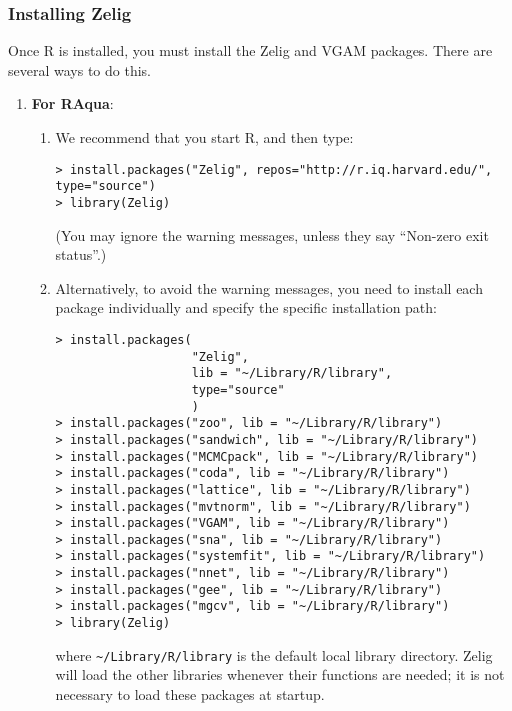 \subsubsection{Installing Zelig}\label{osx.manual}

Once R is installed, you must install the Zelig and VGAM packages.
There are several ways to do this.
\begin{enumerate}
\item {\bf For RAqua}:
  \begin{enumerate}
    
  \item We recommend that you start R, and then type:
\begin{verbatim}
> install.packages("Zelig", repos="http://r.iq.harvard.edu/", type="source")
> library(Zelig)
\end{verbatim}
(You may ignore the warning messages, unless they say ``Non-zero exit 
status''.)
\item Alternatively, to avoid the warning messages, you need to install 
each package individually and specify the specific installation path:
\begin{verbatim}
> install.packages(
                   "Zelig",
                   lib = "~/Library/R/library",
                   type="source"
                   )
> install.packages("zoo", lib = "~/Library/R/library")
> install.packages("sandwich", lib = "~/Library/R/library")
> install.packages("MCMCpack", lib = "~/Library/R/library")
> install.packages("coda", lib = "~/Library/R/library")
> install.packages("lattice", lib = "~/Library/R/library")
> install.packages("mvtnorm", lib = "~/Library/R/library")
> install.packages("VGAM", lib = "~/Library/R/library")
> install.packages("sna", lib = "~/Library/R/library")
> install.packages("systemfit", lib = "~/Library/R/library")
> install.packages("nnet", lib = "~/Library/R/library")
> install.packages("gee", lib = "~/Library/R/library")
> install.packages("mgcv", lib = "~/Library/R/library")
> library(Zelig)
\end{verbatim}
    where \texttt{\~{}/Library/R/library} is the default local library
    directory. Zelig will load the other libraries whenever their functions
    are needed; it is not necessary to load these packages at startup.
    

\end{enumerate}
\end{enumerate}

